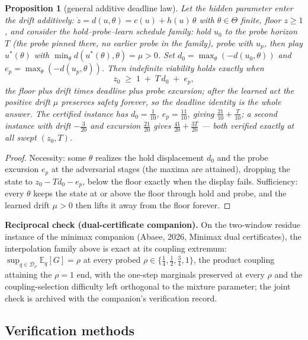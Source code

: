 \documentclass[10pt,twocolumn]{article}
\theoremstyle{plain}
\newtheorem{proposition}[theorem]{Proposition}
\theoremstyle{definition}
\theoremstyle{remark}
\begin{document}
\begin{proposition}[general additive deadline law]\label{prop:additivelaw}
Let the hidden parameter enter the drift additively:
\(\dot z = d(u, \theta) = c(u) + h(u)\,\theta\) with
\(\theta \in \Theta\) finite, floor \(z \ge 1\), and consider the
hold--probe--learn schedule family: hold \(u_{0}\) to the probe horizon
\(T\) (the probe pinned there, no earlier probe in the family), probe
with \(u_{p}\), then play \(u^{*}(\theta)\) with
\(\min_{\theta} d(u^{*}(\theta), \theta) = \mu > 0\). Set
\(d_{0} = \max_{\theta}(-d(u_{0}, \theta))\) and
\(e_{p} = \max_{\theta}(-d(u_{p}, \theta))\). Then indefinite
viability holds exactly when
\[
z_{0} \;\ge\; 1 \;+\; T\, d_{0} \;+\; e_{p},
\]
the floor plus drift times deadline plus probe excursion; after the
learned act the positive drift \(\mu\) preserves safety forever, so
the deadline identity is the whole answer. The certified instance has
\(d_{0} = \tfrac1{10}\), \(e_{p} = \tfrac{11}{10}\), giving
\(\tfrac{21}{10} + \tfrac{T}{10}\); a second instance with drift
\(-\tfrac{3}{20}\) and excursion \(\tfrac{21}{20}\) gives
\(\tfrac{41}{20} + \tfrac{3T}{20}\) --- both verified exactly at all
swept \((z_{0}, T)\).
\end{proposition}

\begin{proof}
Necessity: some \(\theta\) realizes the hold displacement \(d_{0}\)
and the probe excursion \(e_{p}\) at the adversarial stages (the maxima
are attained), dropping the state to
\(z_{0} - T d_{0} - e_{p}\), below the floor exactly when the display
fails. Sufficiency: every \(\theta\) keeps the state at or above the
floor through hold and probe, and the learned drift \(\mu > 0\) then
lifts it away from the floor forever.
\end{proof}

\medskip
\noindent\textbf{Reciprocal check (dual-certificate companion).} On the
two-window residue instance of the minimax companion (Abaee, 2026, Minimax dual certificates), the
interpolation family above is exact at its coupling extremum:
\(\sup_{q \in \mathcal{D}_{\rho}} \mathbb{E}_{q}[G] = \rho\) at
every probed \(\rho \in \{\tfrac14, \tfrac12, \tfrac34, 1\}\),
the product coupling attaining the \(\rho = 1\) end, with the
one-step marginals preserved at every \(\rho\) and the
coupling-selection difficulty left orthogonal to the mixture parameter;
the joint check is archived with the companion's verification record.

\subsection{Verification methods}\label{methods}
\end{document}
